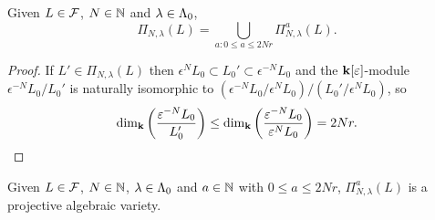 \documentclass[a4paper, 11pt]{report}
\begin{document}
\begin{lemma}
Given $L\in\mathcal{F}$, $N\in\mathbb{N}$ and $\lambda\in\Lambda_0{}$,
\begin{equation*}
\Pi_{N,\lambda}(L) = \bigcup_{a:0\le a\le 2Nr} \Pi_{N,\lambda}^a(L).
\end{equation*}
\end{lemma}

\begin{proof}
If $L'\in\Pi_{N,\lambda}(L)$ then $\epsilon^N L_0\subset L_0'\subset\epsilon^{-N} L_0$ and the $\mathbf{k}[\varepsilon]$-module $\epsilon^{-N} L_0/{L_0'}$ is naturally isomorphic to $(\epsilon^{-N}L_0/{\epsilon^N L_0})/{(L_0'/{\epsilon^N L_0})}$, so
\begin{equation*}
\dim_{\mathbf{k}}\left(\frac{\varepsilon^{-N}L_0}{L_0'}\right) \le \dim_{\mathbf{k}}\left(\frac{\varepsilon^{-N}L_0}{\varepsilon^N L_0}\right) = 2Nr.
\end{equation*}
\end{proof}

\begin{lemma}\label{lemma:projective-varieties-of-cyclic-flags}
Given $L\in\mathcal{F}$, $N\in\mathbb{N}$, $\lambda\in\Lambda_0{}$ and $a\in\mathbb{N}$ with $0\le a\le 2Nr$, $\Pi_{N,\lambda}^a(L)$ is a projective algebraic variety.
\end{lemma}
\end{document}
